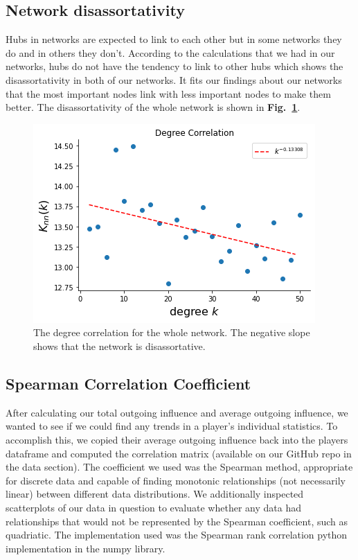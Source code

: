 \documentclass{article}
\begin{document}
\subsection{Network disassortativity}
Hubs in networks are expected to link to each other but in some networks they do and in others they don't. According to the calculations that we had in our networks, hubs do not have the tendency to link to other hubs which shows the disassortativity in both of our networks. It fits our findings about our networks that the most important nodes link with less important nodes to make them better. The disassortativity of the whole network is shown in \textbf{Fig.~\ref{fig3}}.
\begin{figure}[H]
\centering
\includegraphics{images/disfor.png}
\caption{\label{fig3}The degree correlation for the whole network. The negative slope shows that the network is disassortative. }
\end{figure}

\subsection{Spearman Correlation Coefficient}
After calculating our total outgoing influence and average outgoing influence, we wanted to see if we could find any trends in a player's individual statistics.
To accomplish this, we copied their average outgoing influence back into the players dataframe and computed the correlation matrix (available on our GitHub repo in the data section).
The coefficient we used was the Spearman method, appropriate for discrete data and capable of finding monotonic relationships (not necessarily linear) between different data distributions.
We additionally inspected scatterplots of our data in question to evaluate whether any data had relationships that would not be represented by the Spearman coefficient, such as quadriatic.
The implementation used was the Spearman rank correlation python implementation in the numpy library.
\end{document}
